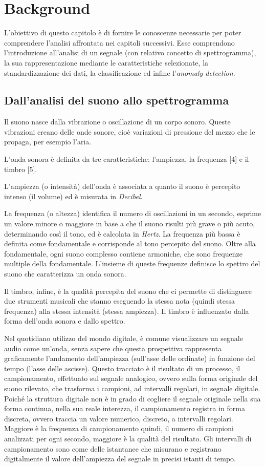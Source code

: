 \chapter{Background}
L'obiettivo di questo capitolo è di fornire le conoscenze necessarie per poter comprendere
l’analisi affrontata nei capitoli successivi. Esse comprendono l'introduzione all'analisi di un
segnale (con relativo concetto di spettrogramma), la sua rappresentazione mediante le
caratteristiche selezionate, la standardizzazione dei dati, la classificazione ed infine l’\textit{anomaly
detection}.

\section{Dall’analisi del suono allo spettrogramma}
Il suono nasce dalla vibrazione o oscillazione di un corpo sonoro. Queste vibrazioni creano
delle onde sonore, cioè variazioni di pressione del mezzo che le propaga, per esempio l’aria.

L’onda sonora è definita da tre caratteristiche: l’ampiezza, la frequenza [4] e il timbro [5].

L’ampiezza (o intensità) dell’onda è associata a quanto il suono è percepito intenso (il
volume) ed è misurata in \textit{Decibel}.

La frequenza (o altezza) identifica il numero di oscillazioni in un secondo, esprime un valore
minore o maggiore in base a che il suono risulti più grave o più acuto, determinando così il
tono, ed è calcolata in \textit{Hertz}. La frequenza più bassa è definita come fondamentale e
corrisponde al tono percepito del suono. Oltre alla fondamentale, ogni suono complesso
contiene armoniche, che sono frequenze multiple della fondamentale. L’insieme di queste
frequenze definisce lo spettro del suono che caratterizza un onda sonora.

Il timbro, infine, è la qualità percepita del suono che ci permette di distinguere due strumenti
musicali che stanno eseguendo la stessa nota (quindi stessa frequenza) alla stessa intensità
(stessa ampiezza). Il timbro è influenzato dalla forma dell’onda sonora e dallo spettro.

Nel quotidiano utilizzo del mondo digitale, è comune visualizzare un segnale audio come
un'onda, senza sapere che questa prospettiva rappresenta graficamente l’andamento
dell’ampiezza (sull’asse delle ordinate) in funzione del tempo (l’asse delle ascisse). Questo
tracciato è il risultato di un processo, il campionamento, effettuato sul segnale analogico,
ovvero sulla forma originale del suono rilevato, che trasforma i campioni, ad intervalli
regolari, in segnale digitale. Poiché la struttura digitale non è in grado di cogliere il segnale
originale nella sua forma continua, nella sua reale interezza, il campionamento registra in
forma discreta, ovvero traccia un valore numerico, discreto, a intervalli regolari. Maggiore è
la frequenza di campionamento quindi, il numero di campioni analizzati per ogni secondo,
maggiore è la qualità del risultato. Gli intervalli di campionamento sono come delle
istantanee che misurano e registrano digitalmente il valore dell’ampiezza del segnale in
precisi istanti di tempo.

